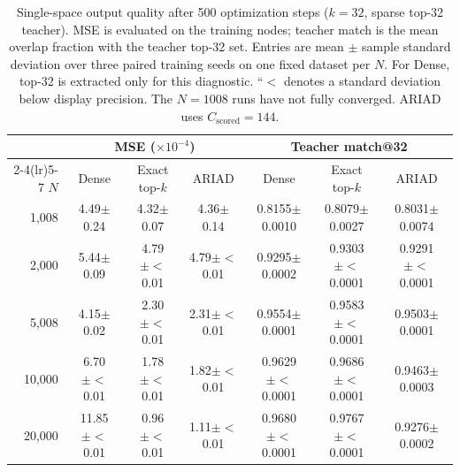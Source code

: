 \begin{table}[t]
\centering
\caption{Single-space output quality after 500 optimization steps ($k=32$, sparse top-32 teacher). MSE is evaluated on the training nodes; teacher match is the mean overlap fraction with the teacher top-32 set. Entries are mean $\pm$ sample standard deviation over three paired training seeds on one fixed dataset per $N$. For Dense, top-32 is extracted only for this diagnostic. ``$<$ denotes a standard deviation below display precision. The $N=1008$ runs have not fully converged. ARIAD uses $C_{\mathrm{scored}}=144$.}
\label{tab:single-quality}
\footnotesize
\setlength{\tabcolsep}{3.5pt}
\begin{tabular}{r ccc ccc}
\toprule
 & \multicolumn{3}{c}{MSE ($\times 10^{-4}$)} & \multicolumn{3}{c}{Teacher match@32} \\
\cmidrule(lr){2-4}\cmidrule(lr){5-7}
$N$ & Dense & Exact top-$k$ & ARIAD & Dense & Exact top-$k$ & ARIAD \\
\midrule
1,008 & 4.49$\pm$0.24 & 4.32$\pm$0.07 & 4.36$\pm$0.14 & 0.8155$\pm$0.0010 & 0.8079$\pm$0.0027 & 0.8031$\pm$0.0074 \\
2,000 & 5.44$\pm$0.09 & 4.79$\pm{<}$0.01 & 4.79$\pm{<}$0.01 & 0.9295$\pm$0.0002 & 0.9303$\pm{<}$0.0001 & 0.9291$\pm{<}$0.0001 \\
5,008 & 4.15$\pm$0.02 & 2.30$\pm{<}$0.01 & 2.31$\pm{<}$0.01 & 0.9554$\pm$0.0001 & 0.9583$\pm{<}$0.0001 & 0.9503$\pm$0.0001 \\
10,000 & 6.70$\pm{<}$0.01 & 1.78$\pm{<}$0.01 & 1.82$\pm{<}$0.01 & 0.9629$\pm{<}$0.0001 & 0.9686$\pm{<}$0.0001 & 0.9463$\pm$0.0003 \\
20,000 & 11.85$\pm{<}$0.01 & 0.96$\pm{<}$0.01 & 1.11$\pm{<}$0.01 & 0.9680$\pm{<}$0.0001 & 0.9767$\pm{<}$0.0001 & 0.9276$\pm$0.0002 \\
\bottomrule
\end{tabular}
\end{table}
